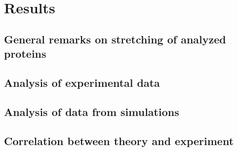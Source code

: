 \chapter{Results}
\label{chap:results}

\section{General remarks on stretching of analyzed proteins}
\label{sec:results_general}

\section{Analysis of experimental data}
\label{sec:results_experiment}

\section{Analysis of data from simulations}
\label{sec:results_theory}

\section{Correlation between theory and experiment}
\label{sec:results_comparison}